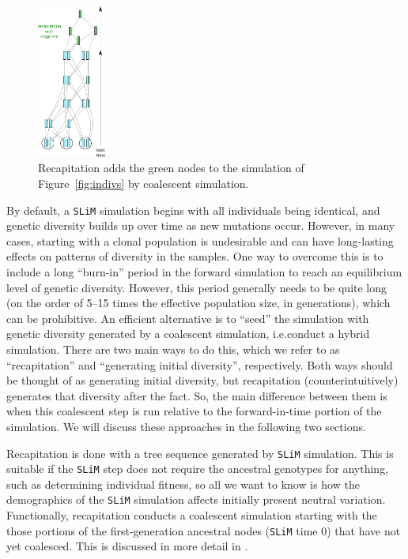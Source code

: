 \documentclass[12pt]{article}
\newcommand{\slim}[0]{\texttt{SLiM}\xspace}
\newcommand*{\ie}{i.e.\xcomma}
\begin{document}
\begin{figure}
\centering
    \includegraphics[width=0.2\textwidth]{figures/pedigree_recapitate.pdf}
\caption{
    Recapitation adds the green nodes 
    to the simulation of Figure~\ref{fig:indivs} by coalescent simulation.
}
\label{fig:recap_simp}
\end{figure}

By default, a \slim simulation begins with all individuals being identical, and genetic diversity
builds up over time as new mutations occur. However, in many cases, starting with a clonal population
is undesirable and can have long-lasting effects on patterns of diversity in the samples. One way to overcome
this is to include a long ``burn-in'' period in the forward simulation to reach an equilibrium level of genetic diversity.
However, this period generally needs to be quite long (on the order of 5--15 times the effective population size, in generations),
which can be prohibitive.
An efficient alternative is to ``seed'' the simulation with genetic diversity generated by a coalescent simulation, \ie conduct a hybrid simulation.
There are two main ways to do this, which we refer to as ``recapitation'' and ``generating initial diversity'', respectively.
Both ways should be thought of as generating initial diversity, but recapitation (counterintuitively) generates that diversity after the fact.
So, the main difference between them is when
this coalescent step is run relative to the forward-in-time portion of the simulation.
We will discuss these approaches in the following two sections.

Recapitation is done with a tree sequence generated by \slim simulation.
This is suitable if the \slim step does not require the ancestral genotypes for anything, such as determining individual fitness,
so all we want to know is how the demographics of the \slim simulation affects initially present neutral variation.
Functionally, recapitation conducts a coalescent simulation
starting with the those portions of the first-generation ancestral nodes (\slim time 0) that have not yet coalesced.
This is discussed in more detail in \citet{haller_tree-sequence_2019}.
\end{document}
